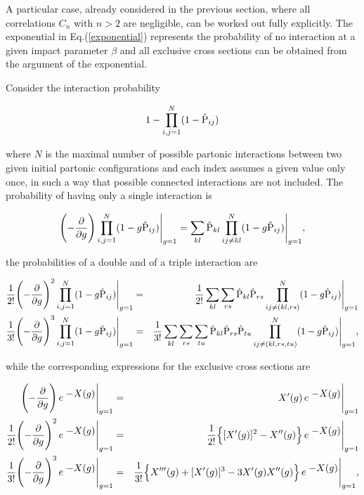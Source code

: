 \documentclass{ws-rv9x6}
\newcommand{\esp}[1]{\, e^{\,\,\textstyle {#1}}}
\begin{document}
A particular case, already considered in the previous section, where all correlations
$C_n$ with $n>2$ are negligible, can be worked out fully explicitly. The exponential in Eq.(\ref{exponential}) represents the probability of no interaction at a given impact parameter $\beta$ and all exclusive cross sections can be obtained from the argument of the exponential. 

Consider the interaction probability 

\begin{eqnarray}1-\prod_{i,j=1}^N(1-\hat{\rm P}_{ij})
\end{eqnarray}

\noindent where $N$ is the maximal number of possible partonic interactions between two given initial partonic configurations and each index assumes a given value
only once, in such a way that possible connected interactions are not
included. The probability of having only a single interaction is 

\begin{eqnarray}\Biggl(-{\partial\over\partial g}\Biggr)\prod_{i,j=1}^N(1-g\hat{\rm P}_{ij})\Bigg|_{g=1}=\sum_{kl}\hat{\rm P}_{kl}\prod_{ij\neq kl}^N(1-g\hat{\rm P}_{ij})\Bigg|_{g=1},\end{eqnarray}

\noindent the probabilities of a double and of a triple
interaction are

\begin{eqnarray}{1\over 2!}\Biggl(-{\partial\over\partial g}\Biggr)^2\prod_{i,j=1}^N(1-g\hat{\rm P}_{ij})\Bigg|_{g=1}&=&{1\over 2!}\sum_{kl}\sum_{rs}\hat{\rm P}_{kl}\hat{\rm P}_{rs}\prod_{ij\neq
(kl,rs)}^N(1-g\hat{\rm P}_{ij})\Bigg|_{g=1}\\
{1\over 3!}\Biggl(-{\partial\over\partial
g}\Biggr)^3\prod_{i,j=1}^N(1-g\hat{\rm P}_{ij})\Bigg|_{g=1}&=&{1\over
3!}\sum_{kl}\sum_{rs}\sum_{tu}\hat{\rm P}_{kl}\hat{\rm P}_{rs}\hat{\rm P}_{tu}\prod_{ij\neq
(kl,rs,tu)}^N(1-g\hat{\rm P}_{ij})\Bigg|_{g=1},\nonumber\end{eqnarray}

\noindent while the corresponding expressions for the exclusive
cross sections are

\begin{eqnarray}\label{exclusiveX}\Biggl(-{\partial\over\partial
g}\Biggr)\esp{-X(g)}\Bigg|_{g=1}&=&X'(g)\esp{-X(g)}\Bigg|_{g=1}\nonumber\\
{1\over2!}\Biggl(-{\partial\over\partial
g}\Biggr)^2\esp{-X(g)}\Bigg|_{g=1}&=&{1\over2!}\Bigl\{[X'(g)]^2-X''(g)\Bigr\}\esp{-X(g)}\Bigg|_{g=1}\\
{1\over3!}\Biggl(-{\partial\over\partial
g}\Biggr)^3\esp{-X(g)}\Bigg|_{g=1}&=&{1\over3!}\Bigl\{X'''(g)+[X'(g)]^3-3X'(g)X''(g)\Bigr\}\esp{-X(g)}\Bigg|_{g=1},\nonumber
\end{eqnarray}
\end{document}
